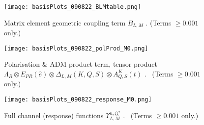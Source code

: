 \documentclass[10pt]{article}
\begin{document}


\begin{figure}[]
\begin{center}
\texttt{[image: basisPlots\_090822\_BLMtable.png]}
\caption{Matrix element geometric coupling term \(B_{L,M}\) . (Terms \(\ge0.001\) only.)\label{776753}}
\end{center}
\end{figure}


\begin{figure}[]
\begin{center}
\texttt{[image: basisPlots\_090822\_polProd\_M0.png]}
\caption{Polarisation \& ADM product term, tensor product \(\Lambda_{R}\otimes E_{PR}(\hat{e})\otimes\Delta_{L,M}(K,Q,S)\otimes
A^{K}_{Q,S}(t)\) .     (Terms \(\ge0.001\) only.)\label{652406}}
\end{center}
\end{figure}


\begin{figure}[]
\begin{center}
\texttt{[image: basisPlots\_090822\_response\_M0.png]}
\caption{Full channel (response) functions \(\varUpsilon_{L,M}^{u,\zeta\zeta'}\) .     (Terms \(\ge0.001\) only.)\label{676540}}
\end{center}
\end{figure}



\end{document}
